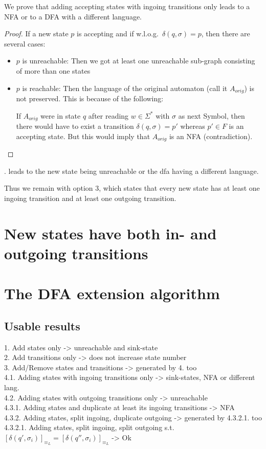 \documentclass[a4paper, oneside, 11pt]{report}
\begin{document}
We prove that adding accepting states with ingoing transitions only leads to a NFA or to a DFA with a different language.
\begin{proof}
	If a new state $p$ is accepting and if w.l.o.g.\ $\delta(q, \sigma) = p$, then there are several cases:
	\begin{itemize}
		\item $p$ is unreachable: Then we got at least one unreachable sub-graph consisting of more than one states
		\item $p$ is reachable: Then the language of the original automaton (call it $A_{orig}$) is not preserved. This is because of the following:
		
		If $A_{orig}$ were in state $q$ after reading $w \in \Sigma^*$ with $\sigma$ as next Symbol, then there would have to exist a transition $\delta(q, \sigma) = p'$ whereas $p' \in F$ is an accepting state. But this would imply that $A_{orig}$ is an NFA (contradiction).
	\end{itemize}
\end{proof}

. leads to the new state being unreachable or the dfa having a different language.

Thus we remain with option 3, which states that every new state has at least one ingoing transition and at least one outgoing transition.

\section{New states have both in- and outgoing transitions}



\section{The DFA extension algorithm}

\subsection{Usable results}

1. Add states only -> unreachable and sink-state \\
2. Add transitions only -> does not increase state number \\
3. Add/Remove states and transitions -> generated by 4. too \\
4.1. Adding states with ingoing transitions only -> sink-states, NFA or different lang. \\
4.2. Adding states with outgoing transitions only -> unreachable \\
4.3.1. Adding states and duplicate at least its ingoing transitions -> NFA \\
4.3.2. Adding states, split ingoing, duplicate outgoing -> generated by 4.3.2.1. too \\
4.3.2.1. Adding states, split ingoing, split outgoing s.t. $[\delta(q', \sigma_i)]_{\equiv_L} = [\delta(q'', \sigma_i)]_{\equiv_L}$ -> Ok
\end{document}
